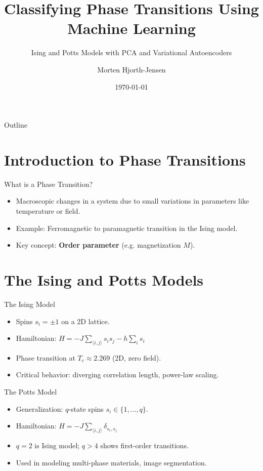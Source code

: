 \documentclass{beamer}
\title{Classifying Phase Transitions Using Machine Learning}
\subtitle{Ising and Potts Models with PCA and Variational Autoencoders}
\author{Morten Hjorth-Jensen}
\date{\today}
\begin{document}
\frame{\titlepage}

\begin{frame}{Outline}
\tableofcontents
\end{frame}

\section{Introduction to Phase Transitions}
\begin{frame}{What is a Phase Transition?}
\begin{itemize}
    \item Macroscopic changes in a system due to small variations in parameters like temperature or field.
    \item Example: Ferromagnetic to paramagnetic transition in the Ising model.
    \item Key concept: \textbf{Order parameter} (e.g. magnetization $M$).
\end{itemize}
\end{frame}

\section{The Ising and Potts Models}
\begin{frame}{The Ising Model}
\begin{itemize}
    \item Spins $s_i = \pm 1$ on a 2D lattice.
    \item Hamiltonian: $H = -J \sum_{\langle i,j \rangle} s_i s_j - h \sum_i s_i$
    \item Phase transition at $T_c \approx 2.269$ (2D, zero field).
    \item Critical behavior: diverging correlation length, power-law scaling.
\end{itemize}
\end{frame}

\begin{frame}{The Potts Model}
\begin{itemize}
    \item Generalization: $q$-state spins $s_i \in \{1, ..., q\}$.
    \item Hamiltonian: $H = -J \sum_{\langle i,j \rangle} \delta_{s_i, s_j}$
    \item $q = 2$ is Ising model; $q > 4$ shows first-order transitions.
    \item Used in modeling multi-phase materials, image segmentation.
\end{itemize}
\end{frame}
\end{document}
